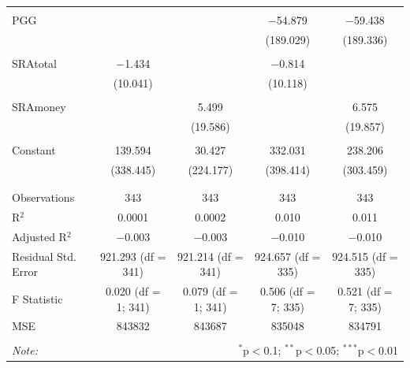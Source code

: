 \documentclass[12pt]{article}
\begin{document}
\begin{table}[!htbp]
\begin{adjustbox}{width=\textwidth}
\begin{tabular}{@{\extracolsep{5pt}}lcccc}
  & & & & \\ 
 PGG &  &  & $-$54.879 & $-$59.438 \\ 
  &  &  & (189.029) & (189.336) \\ 
  & & & & \\ 
 SRAtotal & $-$1.434 &  & $-$0.814 &  \\ 
  & (10.041) &  & (10.118) &  \\ 
  & & & & \\ 
 SRAmoney &  & 5.499 &  & 6.575 \\ 
  &  & (19.586) &  & (19.857) \\ 
  & & & & \\ 
 Constant & 139.594 & 30.427 & 332.031 & 238.206 \\ 
  & (338.445) & (224.177) & (398.414) & (303.459) \\ 
  & & & & \\ 
\hline \\[-1.8ex] 
Observations & 343 & 343 & 343 & 343 \\ 
R$^{2}$ & 0.0001 & 0.0002 & 0.010 & 0.011 \\ 
Adjusted R$^{2}$ & $-$0.003 & $-$0.003 & $-$0.010 & $-$0.010 \\ 
Residual Std. Error & 921.293 (df = 341) & 921.214 (df = 341) & 924.657 (df = 335) & 924.515 (df = 335) \\ 
F Statistic & 0.020 (df = 1; 341) & 0.079 (df = 1; 341) & 0.506 (df = 7; 335) & 0.521 (df = 7; 335) \\ 
MSE & 843832 & 843687 & 835048 & 834791 \\
\hline 
\hline \\[-1.8ex] 
\textit{Note:}  & \multicolumn{4}{r}{$^{*}$p$<$0.1; $^{**}$p$<$0.05; $^{***}$p$<$0.01} \\ 
\end{tabular} 
\end{adjustbox}
\end{table} 
\end{document}
